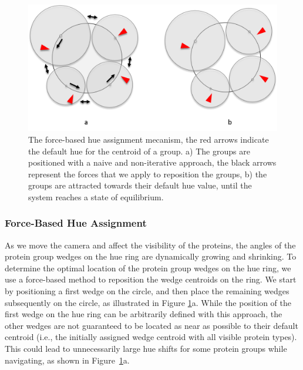 \documentclass{egpubl}
\begin{document}
	\begin{figure}
		\centering
		\includegraphics[width=0.85\linewidth]{"Figures/force-based layout"}
		\caption{The force-based hue assignment mecanism, the red arrows indicate the default hue for the centroid of a group. a) The groups are positioned with a naive and non-iterative approach, the black arrows represent the forces that we apply to reposition the groups, b) the groups are attracted towards their default hue value, until the system reaches a state of equilibrium.}
		\label{fig:force-basedlayout}
	\end{figure}
	
	\subsubsection{Force-Based Hue Assignment}
	
	
	As we move the camera and affect the visibility of the proteins, the angles of the protein group wedges on the hue ring are dynamically growing and shrinking. 
	To determine the optimal location of the protein group wedges on the hue ring, we use a force-based method to reposition the wedge centroids on the ring. 
	We start by positioning a first wedge on the circle, and then place the remaining wedges subsequently on the circle, as illustrated in Figure \ref{fig:force-basedlayout}a.
	While the position of the first wedge on the hue ring can be arbitrarily defined with this approach, the other wedges are not guaranteed to be located as near as possible to their default centroid (i.e., the initially assigned wedge centroid with all visible protein types).
	This could lead to unnecessarily large hue shifts for some protein groups while navigating, as shown in Figure~\ref{fig:force-basedlayout}a.
	
\end{document}
